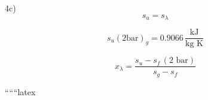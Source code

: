 4c) 
\[
s_u = s_\lambda
\]

\[
s_u (2 \text{bar})_g = 0.9066 \, \frac{\text{kJ}}{\text{kg K}}
\]

\[
x_\lambda = \frac{s_u - s_f \, (\text{2 bar})}{s_g - s_f}
\]

``````latex